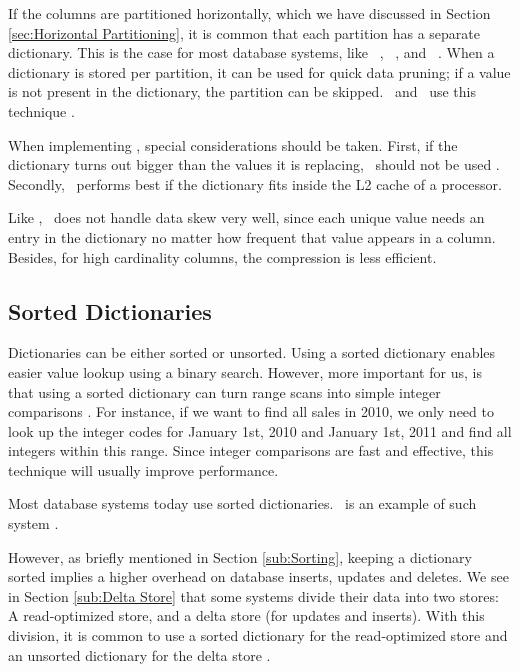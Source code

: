 If the columns are partitioned horizontally, which we have discussed in Section \ref{sec:Horizontal Partitioning}, it is common that each partition has a separate dictionary. This is the case for most database systems, like \oracle~\cite{Lahiri2015-mz}, \blink~\cite{Barber2012-xt}, and \mssql~\cite{Larson2013-mc}. When a dictionary is stored per partition, it can be used for quick data pruning; if a value is not present in the dictionary, the partition can be skipped. \blink~and \monetx~use this technique \cite{Barber2012-xt, Boncz2005-wj}. 

When implementing \de, special considerations should be taken. First, if the dictionary turns out bigger than the values it is replacing, \de~should not be used \cite{Holloway2008-rr}. Secondly, \de~performs best if the dictionary fits inside the L2 cache of a processor.

Like \bp, \de~does not handle data skew very well, since each unique value needs an entry in the dictionary no matter how frequent that value appears in a column. Besides, for high cardinality columns, the compression is less efficient.

\subsection{Sorted Dictionaries}
\label{sub:Sorted Dictionaries}
Dictionaries can be either sorted or unsorted. Using a sorted dictionary enables easier value lookup using a binary search. However, more important for us, is that using a sorted dictionary can turn range scans into simple integer comparisons \cite{Faust2015-ke}. For instance, if we want to find all sales in 2010, we only need to look up the integer codes for January 1st, 2010 and January 1st, 2011 and find all integers within this range. Since integer comparisons are fast and effective, this technique will usually improve performance. 

Most database systems today use sorted dictionaries. \saph~is an example of such system \cite{Farber2012-vh}.

However, as briefly mentioned in Section \ref{sub:Sorting}, keeping a dictionary sorted implies a higher overhead on database inserts, updates and deletes. We see in Section \ref{sub:Delta Store} that some systems divide their data into two stores: A read-optimized store, and a delta store (for updates and inserts). With this division, it is common to use a sorted dictionary for the read-optimized store and an unsorted dictionary for the delta store \cite{Plattner2014-fr}.

